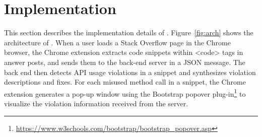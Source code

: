 \section{Implementation}
\label{sec:implementation}

This section describes the implementation details of {\tool}. Figure~\ref{fig:arch} shows the architecture of {\tool}.  When a user loads a Stack Overflow page in the Chrome browser, the Chrome extension extracts code snippets within {\ttt <code>} tags in answer posts, and sends them to the back-end server in a {\ttt JSON} message. The back end then detects API usage violations in a snippet and synthesizes violation descriptions and fixes. For each misused method call in a snippet, the Chrome extension generates a pop-up window using the Bootstrap popover plug-in\footnote{\url{https://www.w3schools.com/bootstrap/bootstrap_popover.asp}} to visualize the violation information received from the server.


